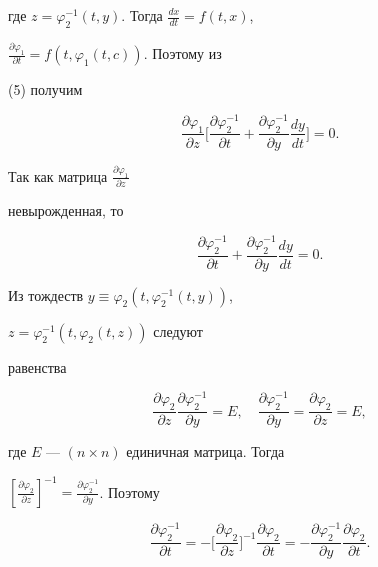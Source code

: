 где $z=\varphi^{-1}_2(t,y)$. Тогда $\frac{dx}{dt}=f(t,x)$, 


$\frac{\partial\varphi_1}{\partial t}=f(t,\varphi_1(t,c))$. Поэтому из 


(5) получим 


$$ 


\frac{\partial\varphi_1}{\partial z}\biggl[ 


\frac{\partial\varphi^{-1}_2}{\partial t}+ 


\frac{\partial\varphi^{-1}_2}{\partial y}\frac{dy}{dt}\biggr]=0. 


$$ 


Так как матрица $\frac{\partial\varphi_1}{\partial z}$ 


невырожденная, то 


\begin{equation} 


\frac{\partial\varphi^{-1}_2}{\partial t}+ 


\frac{\partial\varphi^{-1}_2}{\partial y}\frac{dy}{dt}=0. 


\end{equation} 


Из тождеств $y\equiv\varphi_2(t,\varphi^{-1}_2(t,y))$, 


$z=\varphi^{-1}_2(t,\varphi_2(t,z))$ следуют 


равенства 


$$ 


\frac{\partial\varphi_2}{\partial z} 


\frac{\partial\varphi^{-1}_2}{\partial y}=E,\quad 


\frac{\partial\varphi^{-1}_2}{\partial y}= 


\frac{\partial\varphi_2}{\partial z}=E, 


$$ 


где $E$ --- $(n\times n)$ единичная матрица. Тогда 


$\left[\frac{\partial\varphi_2}{\partial z}\right]^{-1}= 


\frac{\partial\varphi^{-1}_2}{\partial y}$. Поэтому 


\begin{equation} 


\frac{\partial\varphi^{-1}_2}{\partial t}=-\biggl[ 


\frac{\partial\varphi_2}{\partial z}\biggr]^{-1} 


\frac{\partial\varphi_2}{\partial t}=- 


\frac{\partial\varphi^{-1}_2}{\partial y} 


\frac{\partial\varphi_2}{\partial t}. 


\end{equation} 


